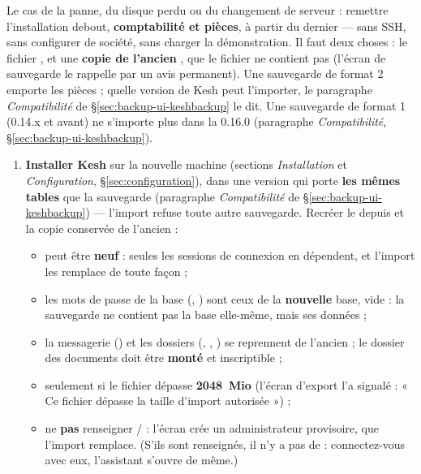\documentclass[a4paper,11pt,oneside]{article}
\begin{document}
Le cas de la panne, du disque perdu ou du changement de serveur : remettre l'installation debout, \textbf{comptabilité et pièces}, à partir du dernier  --- sans SSH, sans configurer de société, sans charger la démonstration. Il faut deux choses : le fichier , et une \textbf{copie de l'ancien} , que le fichier ne contient pas (l'écran de sauvegarde le rappelle par un avis permanent). Une sauvegarde de format 2 emporte les pièces ; quelle version de Kesh peut l'importer, le paragraphe \emph{Compatibilité} de \S\ref{sec:backup-ui-keshbackup} le dit. Une sauvegarde de format 1 (0.14.x et avant) ne s'importe plus dans la 0.16.0 (paragraphe \emph{Compatibilité}, \S\ref{sec:backup-ui-keshbackup}).

\begin{enumerate}
    \item \textbf{Installer Kesh} sur la nouvelle machine (sections \emph{Installation} et \emph{Configuration}, \S\ref{sec:configuration}), dans une version qui porte \textbf{les mêmes tables} que la sauvegarde (paragraphe \emph{Compatibilité} de \S\ref{sec:backup-ui-keshbackup}) --- l'import refuse toute autre sauvegarde. Recréer le  depuis  et la copie conservée de l'ancien :
    \begin{itemize}
        \item {} peut être \textbf{neuf} : seules les sessions de connexion en dépendent, et l'import les remplace de toute façon ;
        \item les mots de passe de la base (, ) sont ceux de la \textbf{nouvelle} base, vide : la sauvegarde ne contient pas la base elle-même, mais ses données ;
        \item la messagerie () et les dossiers (, , ) se reprennent de l'ancien  ; le dossier des documents doit être \textbf{monté} et inscriptible ;
        \item {} seulement si le fichier dépasse \textbf{2048~Mio} (l'écran d'export l'a signalé : « Ce fichier dépasse la taille d'import autorisée ») ;
        \item ne \textbf{pas} renseigner  /  : l'écran  crée un administrateur provisoire, que l'import remplace. (S'ils sont renseignés, il n'y a pas de  : connectez-vous avec eux, l'assistant s'ouvre de même.)

\end{itemize}
\end{enumerate}
\end{document}
